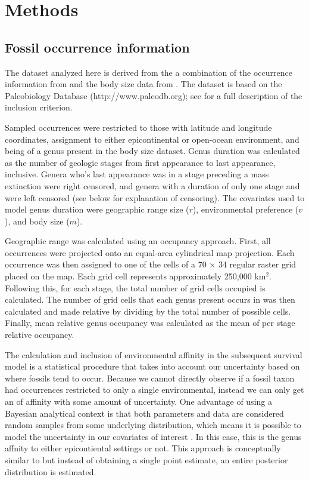 \documentclass[12pt,letterpaper]{article}
\begin{document}
\section{Methods}

\subsection{Fossil occurrence information}

The dataset analyzed here is derived from the a combination of the occurrence information from \citet{Miller2009a} and the body size data from \citet{Payne2014}. The \citet{Miller2009a} dataset is based on the Paleobiology Database (http://www.paleodb.org); see \citet{Miller2009a} for a full description of the inclusion criterion. 

Sampled occurrences were restricted to those with latitude and longitude coordinates, assignment to either epicontinental or open-ocean environment, and being of a genus present in the body size dataset. Genus duration was calculated as the number of geologic stages from first appearance to last appearance, inclusive. Genera who's last appearance was in a stage preceding a mass extinction were right censored, and genera with a duration of only one stage and were left censored (see below for explanation of censoring). The covariates used to model genus duration were geographic range size (\(r\)), environmental preference (\(v\)), and body size (\(m\)). 

Geographic range was calculated using an occupancy approach. First, all occurrences were projected onto an equal-area cylindrical map projection. Each occurrence was then assigned to one of the cells of a 70 \(\times\) 34 regular raster grid placed on the map. Each grid cell represents approximately 250,000 km\(^{2}\). Following this, for each stage, the total number of grid cells occupied is calculated. The number of grid cells that each genus present occurs in was then calculated and made relative by dividing by the total number of possible cells. Finally, mean relative genus occupancy was calculated as the mean of per stage relative occupancy.

The calculation and inclusion of environmental affinity in the subsequent survival model is a statistical procedure that takes into account our uncertainty based on where fossils tend to occur. Because we cannot directly observe if a fossil taxon had occurrences restricted to only a single environmental, instead we can only get an of affinity with some amount of uncertainty. One advantage of using a Bayesian analytical context is that both parameters and data are considered random samples from some underlying distribution, which means it is possible to model the uncertainty in our covariates of interest \citep{Gelman2013d}. In this case, this is the genus affnity to either epicontiental settings or not. This approach is conceptually similar to \citet{Simpson2009} but instead of obtaining a single point estimate, an entire posterior distribution is estimated.
\end{document}
